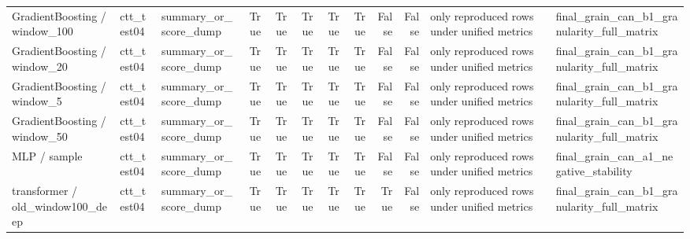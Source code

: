 \begin{tabular}{lllrrrrrrrll}
GradientBoosting / window\_100 & ctt\_test04 & summary\_or\_score\_dump & True & True & True & True & True & False & False & only reproduced rows under unified metrics & final\_grain\_can\_b1\_granularity\_full\_matrix \\
GradientBoosting / window\_20 & ctt\_test04 & summary\_or\_score\_dump & True & True & True & True & True & False & False & only reproduced rows under unified metrics & final\_grain\_can\_b1\_granularity\_full\_matrix \\
GradientBoosting / window\_5 & ctt\_test04 & summary\_or\_score\_dump & True & True & True & True & True & False & False & only reproduced rows under unified metrics & final\_grain\_can\_b1\_granularity\_full\_matrix \\
GradientBoosting / window\_50 & ctt\_test04 & summary\_or\_score\_dump & True & True & True & True & True & False & False & only reproduced rows under unified metrics & final\_grain\_can\_b1\_granularity\_full\_matrix \\
MLP / sample & ctt\_test04 & summary\_or\_score\_dump & True & True & True & True & True & False & False & only reproduced rows under unified metrics & final\_grain\_can\_a1\_negative\_stability \\
transformer / old\_window100\_deep & ctt\_test04 & summary\_or\_score\_dump & True & True & True & True & True & True & False & only reproduced rows under unified metrics & final\_grain\_can\_b1\_granularity\_full\_matrix \\
\bottomrule
\end{tabular}
